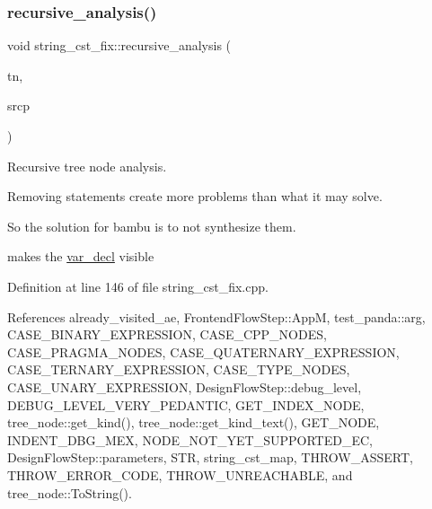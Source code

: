 \subsubsection{\texorpdfstring{recursive\+\_\+analysis()}{recursive\_analysis()}}
{\footnotesize\ttfamily void string\+\_\+cst\+\_\+fix\+::recursive\+\_\+analysis (\begin{DoxyParamCaption}\item[{\hyperlink{tree__node_8hpp_a6ee377554d1c4871ad66a337eaa67fd5}{tree\+\_\+node\+Ref} \&}]{tn,  }\item[{const std\+::string \&}]{srcp }\end{DoxyParamCaption})\hspace{0.3cm}{\ttfamily [protected]}}



Recursive tree node analysis. 

Removing statements create more problems than what it may solve.

So the solution for bambu is to not synthesize them.

makes the \hyperlink{structvar__decl}{var\+\_\+decl} visible 

Definition at line 146 of file string\+\_\+cst\+\_\+fix.\+cpp.



References already\+\_\+visited\+\_\+ae, Frontend\+Flow\+Step\+::\+AppM, test\+\_\+panda\+::arg, C\+A\+S\+E\+\_\+\+B\+I\+N\+A\+R\+Y\+\_\+\+E\+X\+P\+R\+E\+S\+S\+I\+ON, C\+A\+S\+E\+\_\+\+C\+P\+P\+\_\+\+N\+O\+D\+ES, C\+A\+S\+E\+\_\+\+P\+R\+A\+G\+M\+A\+\_\+\+N\+O\+D\+ES, C\+A\+S\+E\+\_\+\+Q\+U\+A\+T\+E\+R\+N\+A\+R\+Y\+\_\+\+E\+X\+P\+R\+E\+S\+S\+I\+ON, C\+A\+S\+E\+\_\+\+T\+E\+R\+N\+A\+R\+Y\+\_\+\+E\+X\+P\+R\+E\+S\+S\+I\+ON, C\+A\+S\+E\+\_\+\+T\+Y\+P\+E\+\_\+\+N\+O\+D\+ES, C\+A\+S\+E\+\_\+\+U\+N\+A\+R\+Y\+\_\+\+E\+X\+P\+R\+E\+S\+S\+I\+ON, Design\+Flow\+Step\+::debug\+\_\+level, D\+E\+B\+U\+G\+\_\+\+L\+E\+V\+E\+L\+\_\+\+V\+E\+R\+Y\+\_\+\+P\+E\+D\+A\+N\+T\+IC, G\+E\+T\+\_\+\+I\+N\+D\+E\+X\+\_\+\+N\+O\+DE, tree\+\_\+node\+::get\+\_\+kind(), tree\+\_\+node\+::get\+\_\+kind\+\_\+text(), G\+E\+T\+\_\+\+N\+O\+DE, I\+N\+D\+E\+N\+T\+\_\+\+D\+B\+G\+\_\+\+M\+EX, N\+O\+D\+E\+\_\+\+N\+O\+T\+\_\+\+Y\+E\+T\+\_\+\+S\+U\+P\+P\+O\+R\+T\+E\+D\+\_\+\+EC, Design\+Flow\+Step\+::parameters, S\+TR, string\+\_\+cst\+\_\+map, T\+H\+R\+O\+W\+\_\+\+A\+S\+S\+E\+RT, T\+H\+R\+O\+W\+\_\+\+E\+R\+R\+O\+R\+\_\+\+C\+O\+DE, T\+H\+R\+O\+W\+\_\+\+U\+N\+R\+E\+A\+C\+H\+A\+B\+LE, and tree\+\_\+node\+::\+To\+String().



